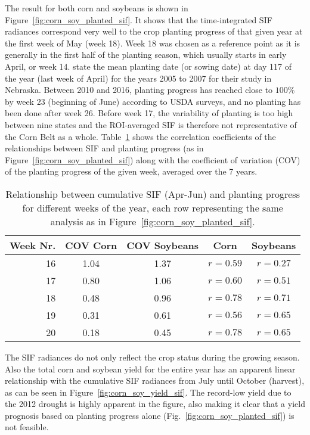 \documentclass[preprint, a4paper, 10pt, times]{elsarticle}
\begin{document}
The result for both corn and soybeans is shown in Figure~\ref{fig:corn_soy_planted_sif}. It shows that the time-integrated SIF radiances correspond very well to the crop planting progress of that given year at the first week of May (week 18). Week 18 was chosen as a reference point as it is generally in the first half of the planting season, which usually starts in early April, or week 14. \citet{grassini2011high} state the mean planting date (or sowing date) at day 117 of the year (last week of April) for the years 2005 to 2007 for their study in Nebraska. Between 2010 and 2016, planting progress has reached close to $100\%$ by week 23 (beginning of June) according to USDA surveys, and no planting has been done after week 26. Before week 17, the variability of planting is too high between nine states and the ROI-averaged SIF is therefore not representative of the Corn Belt as a whole. Table~\ref{tbl:planting_progress_table} shows the correlation coefficients of the relationships between SIF and planting progress (as in Figure~\ref{fig:corn_soy_planted_sif}) along with the coefficient of variation (COV) of the planting progress of the given week, averaged over the 7 years.


\begin{table}[htp]
\begin{center}
\begin{tabular}{r|c|c|c|c}
Week Nr. & COV Corn & COV Soybeans & Corn & Soybeans \\
\hline
16 & 1.04 & 1.37 & $r = 0.59$ & $r = 0.27$ \\
17 & 0.80 & 1.06 & $r = 0.60$ & $r = 0.51$ \\
18 & 0.48 & 0.96 & $r = 0.78$ & $r = 0.71$ \\
19 & 0.31 & 0.61 & $r = 0.56$ & $r = 0.65$ \\
20 & 0.18 & 0.45 & $r = 0.78$ & $r = 0.65$ \\
\end{tabular}
\end{center}
\label{tbl:planting_progress_table}
\caption{Relationship between cumulative SIF (Apr-Jun) and planting progress for different weeks of the year, each row representing the same analysis as in Figure~\ref{fig:corn_soy_planted_sif}.}
\end{table}%

The SIF radiances do not only reflect the crop status during the growing season. Also the total corn and soybean yield for the entire year has an apparent linear relationship with the cumulative SIF radiances from July until October (harvest), as can be seen in Figure~\ref{fig:corn_soy_yield_sif}. The record-low yield due to the 2012 drought is highly apparent in the figure, also making it clear that a yield prognosis based on planting progress alone (Fig.~\ref{fig:corn_soy_planted_sif}) is not feasible.
\end{document}
